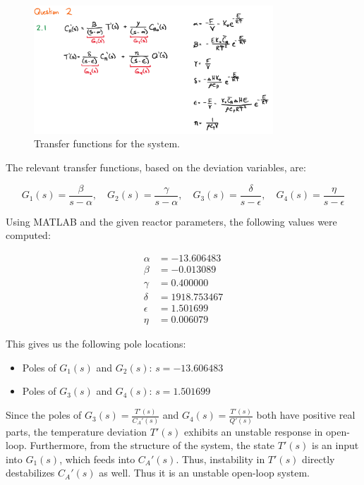\documentclass[12pt]{article}
\begin{document}
\begin{enumerate}
\begin{enumerate}
    \begin{figure}[H]
      \centering
      \includegraphics[width=0.8\textwidth]{Figures/figure2_1.png}
      \caption{Transfer functions for the system.}
      \label{fig:figure2_1}
    \end{figure}

    The relevant transfer functions, based on the deviation variables, are:

    \[
    G_1(s) = \frac{\beta}{s - \alpha}, \quad
    G_2(s) = \frac{\gamma}{s - \alpha}, \quad
    G_3(s) = \frac{\delta}{s - \epsilon}, \quad
    G_4(s) = \frac{\eta}{s - \epsilon}
    \]
    
    Using MATLAB and the given reactor parameters, the following values were computed:
    
    \begin{align*}
    \alpha &= -13.606483 \\
    \beta  &= -0.013089 \\
    \gamma &= 0.400000 \\
    \delta &= 1918.753467 \\
    \epsilon &= 1.501699 \\
    \eta &= 0.006079
    \end{align*}
    
    This gives us the following pole locations:
    
    \begin{itemize}
        \item Poles of \( G_1(s) \) and \( G_2(s) \): \( s = -13.606483 \)
        \item Poles of \( G_3(s) \) and \( G_4(s) \): \( s = 1.501699 \)
    \end{itemize}
    
    Since the poles of \( G_3(s) = \frac{T'(s)}{C_A'(s)} \) and \( G_4(s) = \frac{T'(s)}{Q'(s)} \) both have positive real parts, the temperature deviation \( T'(s) \) exhibits an unstable response in open-loop. Furthermore, from the structure of the system, the state \( T'(s) \) is an input into \( G_1(s) \), which feeds into \( C_A'(s) \). Thus, instability in \( T'(s) \) directly destabilizes \( C_A'(s) \) as well. Thus it is an unstable open-loop system.
    

\end{enumerate}
\end{enumerate}
\end{document}
